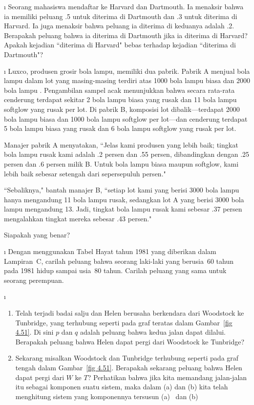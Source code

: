 \begin{LJSItem}
\i\label{exer 4.1.27} Seorang mahasiswa mendaftar ke Harvard dan Dartmouth.  Ia menaksir bahwa ia
memiliki peluang .5 untuk diterima di Dartmouth dan .3 untuk diterima di
Harvard.  Ia juga menaksir bahwa peluang ia diterima di keduanya
adalah .2.  Berapakah peluang bahwa ia diterima di Dartmouth jika ia
diterima di Harvard?  Apakah kejadian ``diterima di Harvard" bebas terhadap
kejadian ``diterima di Dartmouth"?

\i\label{exer 4.1.28} Luxco, produsen grosir bola lampu, memiliki dua pabrik.  Pabrik A
menjual bola lampu dalam lot yang masing-masing terdiri atas 1000 bola lampu biasa dan 2000 bola lampu .
Pengambilan sampel acak menunjukkan bahwa secara rata-rata cenderung terdapat
sekitar 2 bola lampu biasa yang rusak dan 11 bola lampu softglow yang rusak per lot.  Di pabrik B,
komposisi lot dibalik---terdapat 2000 bola lampu biasa dan 1000 bola lampu softglow per lot---dan
cenderung terdapat 5 bola lampu biasa yang rusak dan 6 bola lampu softglow yang rusak per lot.

Manajer pabrik A menyatakan, ``Jelas kami produsen yang lebih baik; tingkat
bola lampu rusak kami adalah .2 persen dan .55 persen, dibandingkan dengan .25 persen dan
.6 persen milik B.  Untuk bola lampu biasa maupun softglow, kami lebih baik sebesar setengah dari sepersepuluh
persen."

``Sebaliknya," bantah manajer B, ``setiap lot kami yang berisi 3000 bola lampu
hanya mengandung 11 bola lampu rusak, sedangkan lot A yang berisi 3000 bola lampu mengandung 13.  Jadi, tingkat
bola lampu rusak kami sebesar .37 persen mengalahkan tingkat mereka sebesar .43 persen."
\par
Siapakah yang benar?

\i\label{exer 4.1.29} Dengan menggunakan Tabel Hayat tahun 1981 yang diberikan dalam Lampiran~C, carilah
peluang bahwa seorang laki-laki yang berusia~60 tahun pada 1981 hidup sampai usia~80 tahun.  Carilah
peluang yang sama untuk seorang perempuan.

\i\label{exer 4.1.30}
\begin{enumerate}
\item Telah terjadi badai salju dan Helen berusaha berkendara dari Woodstock
ke Tunbridge, yang terhubung seperti pada graf teratas dalam Gambar~\ref{fig
4.51}.  Di sini $p$ dan $q$ adalah peluang bahwa kedua jalan dapat dilalui.  Berapakah
peluang bahwa Helen dapat pergi dari Woodstock ke Tunbridge?

\item Sekarang misalkan Woodstock dan Tunbridge terhubung seperti pada graf tengah 
dalam Gambar~\ref{fig 4.51}.
Berapakah sekarang peluang bahwa Helen dapat pergi dari $W$ ke $T$?  Perhatikan bahwa jika kita
memandang jalan-jalan itu sebagai komponen suatu sistem, maka dalam
(a) dan (b) kita telah menghitung
 sistem yang komponennya tersusun (a)~ dan (b)~


\end{enumerate}
\end{LJSItem}
